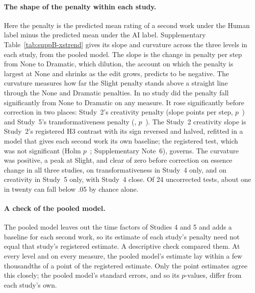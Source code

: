 \paragraph*{The shape of the penalty within each study.}
Here the penalty is the predicted mean rating of a second work under the Human label minus the predicted mean under the AI label. Supplementary Table~\ref{tab:suppB-xstrend} gives its slope and curvature across the three levels in each study, from the pooled model. The slope is the change in penalty per step from None to Dramatic, which dilution, the account on which the penalty is largest at None and shrinks as the edit grows, predicts to be negative. The curvature measures how far the Slight penalty stands above a straight line through the None and Dramatic penalties. In no study did the penalty fall significantly from None to Dramatic on any measure. It rose significantly before correction in two places: Study~2's creativity penalty (slope \XSCreatSlopeSTwoEst{} points per step, $p$~\XSCreatSlopeSTwoP) and Study~5's transformativeness penalty (\XSTransSlopeSFiveEst, $p$~\XSTransSlopeSFiveP). The Study~2 creativity slope is Study~2's registered H3 contrast with its sign reversed and halved, refitted in a model that gives each second work its own baseline; the registered test, which was not significant (Holm $p$~\STwoCreatPenaltyChangePHolm; Supplementary Note~6), governs. The curvature was positive, a peak at Slight, and clear of zero before correction on essence change in all three studies, on transformativeness in Study~4 only, and on creativity in Study~5 only, with Study~4 close. Of 24 uncorrected tests, about one in twenty can fall below .05 by chance alone.



\paragraph*{A check of the pooled model.}
The pooled model leaves out the time factors of Studies 4 and 5 and adds a baseline for each second work, so its estimate of each study's penalty need not equal that study's registered estimate. A descriptive check compared them. At every level and on every measure, the pooled model's estimate lay within a few thousandths of a point of the registered estimate. Only the point estimates agree this closely; the pooled model's standard errors, and so its $p$-values, differ from each study's own.

